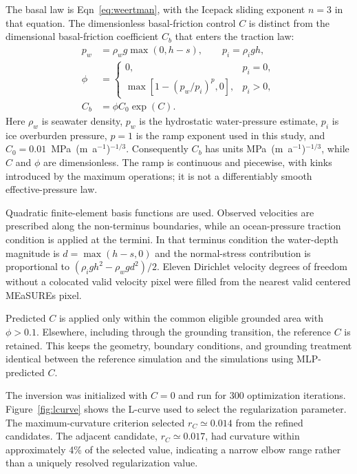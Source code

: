 \documentclass[review,jog]{igs}
\begin{document}
The basal law is Eqn~\ref{eq:weertman}, with the Icepack sliding exponent $n=3$ in that equation. The dimensionless basal-friction control $C$ is distinct from the dimensional basal-friction coefficient $C_b$ that enters the traction law:
\begin{equation}
\label{eq:phi}
\begin{split}
p_w&=\rho_w g\max(0,h-s),\qquad p_i=\rho_i g h,\\
\phi&=
\begin{cases}
0, & p_i=0,\\
\max\!\left[1-\left(p_w/p_i\right)^p,0\right], & p_i>0,
\end{cases}\\
C_b&=\phi C_0\exp(C).
\end{split}
\end{equation}
Here $\rho_w$ is seawater density, $p_w$ is the hydrostatic water-pressure
estimate, $p_i$ is ice overburden pressure, $p=1$ is the ramp exponent used
in this study, and $C_0=0.01$~MPa~(m~a$^{-1}$)$^{-1/3}$. Consequently $C_b$ has
units MPa~(m~a$^{-1}$)$^{-1/3}$, while $C$ and $\phi$ are dimensionless.
The ramp is continuous and piecewise, with kinks introduced by the maximum
operations; it is not a differentiably smooth effective-pressure law.

Quadratic finite-element basis functions are used. Observed velocities are prescribed along the non-terminus boundaries, while an ocean-pressure traction condition is applied at the termini. In that terminus condition the water-depth magnitude is $d=\max(h-s,0)$ and the normal-stress contribution is proportional to $(\rho_i g h^2-\rho_w g d^2)/2$. Eleven Dirichlet velocity degrees of freedom without a colocated valid velocity pixel were filled from the nearest valid centered MEaSUREs pixel. 

Predicted $C$ is applied only within the common eligible grounded area with $\phi>0.1$. Elsewhere, including through the grounding transition, the reference $C$ is retained. This keeps the geometry, boundary conditions, and grounding treatment identical between the reference simulation and the simulations using MLP-predicted $C$.

The inversion was initialized with $C=0$ and run for 300 optimization
iterations. Figure~\ref{fig:lcurve} shows the L-curve used to select the
regularization parameter. The maximum-curvature criterion selected
$r_C\simeq0.014$ from the refined candidates. The adjacent candidate,
$r_C\simeq0.017$, had curvature within approximately 4\% of the selected
value, indicating a narrow elbow range rather than a uniquely resolved
regularization value.
\end{document}
